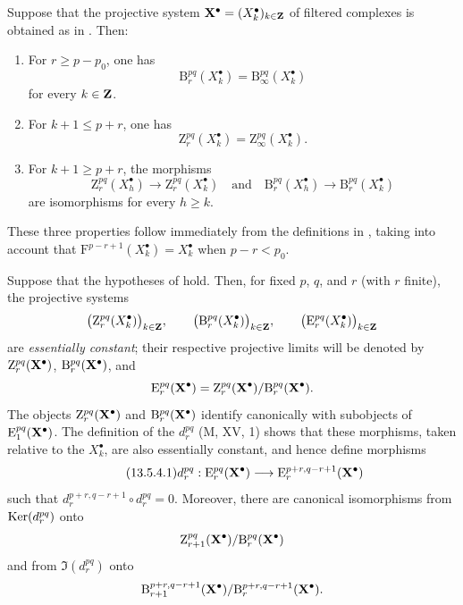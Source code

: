 \begin{lemma}[13.5.3]
\label{0.13.5.3}
Suppose that the projective system
$\mathbf{X}^\bullet=(X^\bullet_k)_{k\in\mathbf{Z}}$ of filtered complexes is
obtained as in . Then:
\begin{enumerate}
  \item[{\rm a)}] For $r\geq p-p_0$, one has
  \[
    \mathrm{B}_r^{pq}(X^\bullet_k)
    =
    \mathrm{B}_\infty^{pq}(X^\bullet_k)
  \]
  for every $k\in\mathbf{Z}$.
  \item[{\rm b)}] For $k+1\leq p+r$, one has
  \[
    \mathrm{Z}_r^{pq}(X^\bullet_k)
    =
    \mathrm{Z}_\infty^{pq}(X^\bullet_k).
  \]
  \item[{\rm c)}] For $k+1\geq p+r$, the morphisms
  \[
    \mathrm{Z}_r^{pq}(X^\bullet_h)
    \longrightarrow
    \mathrm{Z}_r^{pq}(X^\bullet_k)
    \quad\text{and}\quad
    \mathrm{B}_r^{pq}(X^\bullet_h)
    \longrightarrow
    \mathrm{B}_r^{pq}(X^\bullet_k)
  \]
  are isomorphisms for every $h\geq k$.
\end{enumerate}
\end{lemma}

These three properties follow immediately from the definitions in
, taking into account that
$\mathrm{F}^{p-r+1}(X^\bullet_k)=X^\bullet_k$ when $p-r<p_0$.

\begin{env}[13.5.4]
\label{0.13.5.4}
Suppose that the hypotheses of  hold.
Then, for fixed $p$, $q$, and $r$ (with $r$ finite), the projective
systems
\[
  \bigl(\mathrm{Z}_r^{pq}(X^\bullet_k)\bigr)_{k\in\mathbf{Z}},
  \qquad
  \bigl(\mathrm{B}_r^{pq}(X^\bullet_k)\bigr)_{k\in\mathbf{Z}},
  \qquad
  \bigl(\mathrm{E}_r^{pq}(X^\bullet_k)\bigr)_{k\in\mathbf{Z}}
\]
are \emph{essentially constant}; their respective projective limits
will be denoted by
$\mathrm{Z}_r^{pq}(\mathbf{X}^\bullet)$,
$\mathrm{B}_r^{pq}(\mathbf{X}^\bullet)$, and
\[
  \mathrm{E}_r^{pq}(\mathbf{X}^\bullet)
  =
  \mathrm{Z}_r^{pq}(\mathbf{X}^\bullet)/
  \mathrm{B}_r^{pq}(\mathbf{X}^\bullet).
\]
The objects $\mathrm{Z}_r^{pq}(\mathbf{X}^\bullet)$ and
$\mathrm{B}_r^{pq}(\mathbf{X}^\bullet)$ identify canonically with
subobjects of $\mathrm{E}_1^{pq}(\mathbf{X}^\bullet)$.
The definition of the $d_r^{pq}$ (M, XV, 1) shows that these
morphisms, taken relative to the $X^\bullet_k$, are also essentially
constant, and hence define morphisms
\begin{equation}
\label{0.13.5.4.1}
\tag{13.5.4.1}
  d_r^{pq}:
  \mathrm{E}_r^{pq}(\mathbf{X}^\bullet)
  \longrightarrow
  \mathrm{E}_r^{p+r,q-r+1}(\mathbf{X}^\bullet)
\end{equation}
such that
$d_r^{p+r,q-r+1}\circ d_r^{pq}=0$.
Moreover, there are canonical isomorphisms from
$\operatorname{Ker}(d_r^{pq})$ onto
\[
  \mathrm{Z}_{r+1}^{pq}(\mathbf{X}^\bullet)/
  \mathrm{B}_r^{pq}(\mathbf{X}^\bullet)
\]
and from $\Im(d_r^{pq})$ onto
\[
  \mathrm{B}_{r+1}^{p+r,q-r+1}(\mathbf{X}^\bullet)/
  \mathrm{B}_r^{p+r,q-r+1}(\mathbf{X}^\bullet).
\]
\end{env}

